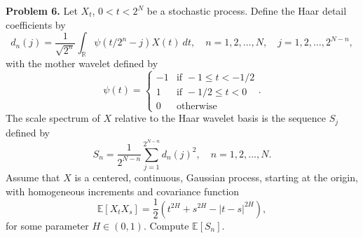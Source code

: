 \documentclass[11pt,letterpaper]{report}
\newcommand{\reals}{\mathbb{R}}
\newcommand{\E}{\mathbb{E}}
\begin{document}
\noindent\textbf{Problem 6. }
Let $X_t$, $0<t<2^N$ be a stochastic process. Define the Haar detail coefficients by
\[
d_n(j) = \frac{1}{\sqrt{2^n}}\int_\reals \psi(t/2^n - j)X(t)\ dt,\quad n = 1, 2, \ldots, N,\quad j = 1, 2, \ldots, 2^{N-n},
\]
with the mother wavelet defined by
\[
\psi(t) = \begin{cases}
	-1&\text{if }-1\leq t<-1/2\\
	1&\text{if }-1/2\leq t<0\\
	0&\text{otherwise}
\end{cases}.
\]
The scale spectrum of $X$ relative to the Haar wavelet basis is the sequence $S_j$ defined by
\[
S_n = \frac{1}{2^{N-n}}\sum_{j=1}^{2^{N-n}}d_n(j)^2,\quad n = 1, 2, \ldots, N.
\]
Assume that $X$ is a centered, continuous, Gaussian process, starting at the origin, with homogeneous increments and covariance function
\[
\E[X_tX_s] = \frac{1}{2}(t^{2H}+s^{2H} - |t-s|^{2H}),
\]
for some parameter $H\in (0,1)$. Compute $\E[S_n]$.
\end{document}
